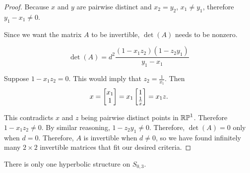 \documentclass{amsart}
\begin{document}
\begin{proof}
		Because $x$ and $y$ are pairwise distinct and $x_2 = y_2$, $x_1 \neq y_1$, therefore $y_1 - x_1 \neq 0$. 
		
		Since we want the matrix $A$ to be invertible, $\det(A)$ needs to be nonzero.
		
		\begin{equation*}
			\det(A) = d^2\frac{(1 - x_1z_2)(1-z_2y_1)}{y_1-x_1}
		\end{equation*}
		
		Suppose $1-x_1z_2 = 0$. This would imply that $z_2 = \frac{1}{x_1}$. Then 
		\begin{equation*}
			x = \begin{bmatrix} x_1 \\ 1 \end{bmatrix} = x_1 \begin{bmatrix} 1 \\ \frac{1}{x} \end{bmatrix} = x_1 z.
		\end{equation*}
		
		This contradicts $x$ and $z$ being pairwise distinct points in $\mathbb{RP}^1$. Therefore $1-x_1z_2 \neq 0$. By similar reasoning, $1-z_2y_1 \neq 0$. Therefore, $\det(A) = 0$ only when $d=0$.
		Therefore, $A$ is invertible when $d\neq 0$, so we have found infinitely many $2 \times 2$ invertible matrices that fit our desired criteria.
	\end{proof}
	
	\bigskip
	
	\begin{theorem}
		There is only one hyperbolic structure on $S_{0,3}$.
	\end{theorem}
	
	\bigskip
\end{document}
